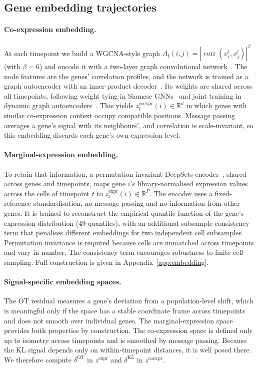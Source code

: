 \documentclass[10pt, letterpaper]{article}
\newcommand{\zco}{z^{\mathrm{coexpr}}}
\newcommand{\zex}{z^{\mathrm{expr}}}
\newcommand{\dOT}{\delta^{\mathrm{OT}}}
\newcommand{\dKL}{\delta^{\mathrm{KL}}}
\begin{document}
\subsection{Gene embedding trajectories}
\label{sec:trajectories}

\paragraph{Co-expression embedding.} At each timepoint we build a WGCNA-style graph $A_t(i,j)=|\operatorname{corr}(x_i^t,x_j^t)|^{\beta}$ (with $\beta=6$) and encode it with a two-layer graph convolutional network~\cite{kipf2017gcn}. The node features are the genes' correlation profiles, and the network is trained as a graph autoencoder with an inner-product decoder~\cite{kipf2016vgae}. Its weights are shared across all timepoints, following weight tying in Siamese GNNs~\cite{krivosheev2020siamesegnn} and joint training in dynamic graph autoencoders~\cite{mahdavi2020dynvgae}. This yields $\zco_t(i)\in\mathbb{R}^d$ in which genes with similar co-expression context occupy compatible positions. Message passing averages a gene's signal with its neighbours', and correlation is scale-invariant, so this embedding discards each gene's own expression level.

\paragraph{Marginal-expression embedding.} To retain that information, a permutation-invariant DeepSets encoder~\cite{zaheer2017deep}, shared across genes and timepoints, maps gene $i$'s library-normalised expression values across the cells of timepoint $t$ to $\zex_t(i)\in\mathbb{R}^P$. The encoder uses a fixed-reference standardisation, no message passing and no information from other genes. It is trained to reconstruct the empirical quantile function of the gene's expression distribution (49 quantiles), with an additional subsample-consistency term that penalises different embeddings for two independent cell subsamples. Permutation invariance is required because cells are unmatched across timepoints and vary in number. The consistency term encourages robustness to finite-cell sampling. Full construction is given in Appendix~\ref{app:embedding}.

\paragraph{Signal-specific embedding spaces.} The OT residual measures a gene's deviation from a population-level shift, which is meaningful only if the space has a stable coordinate frame across timepoints and does not smooth over individual genes. The marginal-expression space provides both properties by construction. The co-expression space is defined only up to isometry across timepoints and is smoothed by message passing. Because the KL signal depends only on within-timepoint distances, it is well posed there. We therefore compute $\dOT$ in $\zex$ and $\dKL$ in $\zco$.
\end{document}
